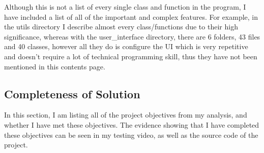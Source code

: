 \documentclass[12pt]{article}
\begin{document}
Although this is not a list of every single class and function in the program, I have included a list of all of the important and complex features. For example, in the utils directory I describe almost every class/functions due to their high significance, whereas with the user\_interface directory, there are 6 folders, 43 files and 40 classes, however all they do is configure the UI which is very repetitive and doesn't require a lot of technical programming skill, thus they have not been mentioned in this contents page.
\clearpage

\subsection{Completeness of Solution}

In this section, I am listing all of the project objectives from my analysis, and whether I have met these objectives. The evidence showing that I have completed these objectives can be seen in my testing video, as well as the source code of the project.
\end{document}
